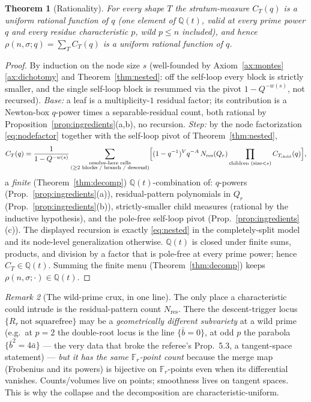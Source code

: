 \documentclass[11pt]{article}
\newtheorem{theorem}{Theorem}
\theoremstyle{definition}
\theoremstyle{remark}
\newtheorem{remark}[theorem]{Remark}
\newcommand{\Fr}{\mathbb{F}_r}
\newcommand{\rhocount}{\rho}
\begin{document}
\begin{theorem}[Rationality]\label{thm:rational}
For every shape $T$ the stratum-measure $C_T(q)$ is a uniform rational function of
$q$ (one element of $\mathbb Q(t)$, valid at every prime power $q$ and every
residue characteristic $p$, wild $p\le n$ included), and hence
$\rhocount(n,\sigma;q)=\sum_{T}C_T(q)$ is a uniform rational function of $q$.
\end{theorem}

\begin{proof}
By induction on the node size $s$ (well-founded by
Axiom~\ref{ax:montes}\ref{ax:dichotomy} and Theorem~\ref{thm:nested}: off the
self-loop every block is strictly smaller, and the single self-loop block is
resummed via the pivot $1-Q^{-w(s)}$, not recursed). \emph{Base:} a leaf is a
multiplicity-$1$ residual factor; its contribution is a Newton-box $q$-power times
a separable-residual count, both rational by Proposition~\ref{prop:ingredients}(a,b),
no recursion. \emph{Step:} by the node factorization \eqref{eq:nodefactor} together
with the self-loop pivot of Theorem~\ref{thm:nested},
\[
  C_T(q)
  = \frac{1}{1-Q^{-w(s)}}
    \sum_{\substack{\text{resolve-here cells}\\(\ge2\text{ blocks / branch / descend})}}
    \Bigl[(1-q^{-1})^{V}q^{-A}\,N_{\mathrm{res}}(Q_r)
      \prod_{\text{children (size}<s)} C_{T_{\text{child}}}(q)\Bigr],
\]
a \emph{finite} (Theorem~\ref{thm:decomp}) $\mathbb Q(t)$-combination of:
$q$-powers (Prop.~\ref{prop:ingredients}(a)), residual-pattern polynomials in $Q_r$
(Prop.~\ref{prop:ingredients}(b)), strictly-smaller child measures (rational by the
inductive hypothesis), and the pole-free self-loop pivot
(Prop.~\ref{prop:ingredients}(c)). The displayed recursion is exactly
\eqref{eq:nested} in the completely-split model and its node-level generalization
otherwise. $\mathbb Q(t)$ is closed under finite sums,
products, and division by a factor that is pole-free at every prime power; hence
$C_T\in\mathbb Q(t)$. Summing the finite menu (Theorem~\ref{thm:decomp}) keeps
$\rhocount(n,\sigma;\cdot)\in\mathbb Q(t)$.
\end{proof}

\begin{remark}[The wild-prime crux, in one line]
The only place a characteristic could intrude is the residual-pattern count
$N_{\mathrm{res}}$. There the descent-trigger locus
$\{R_r\ \text{not squarefree}\}$ may be a \emph{geometrically different
subvariety} at a wild prime (e.g.\ at $p=2$ the double-root locus is the line
$\{\bar b=0\}$, at odd $p$ the parabola $\{\bar b^2=4\bar a\}$ --- the very data
that broke the referee's Prop.\ 5.3, a tangent-space statement) --- \emph{but it
has the same $\Fr$-point count} because the merge map (Frobenius and its powers)
is bijective on $\Fr$-points even when its differential vanishes. Counts/volumes
live on points; smoothness lives on tangent spaces. This is why the collapse and
the decomposition are characteristic-uniform.
\end{remark}
\end{document}
